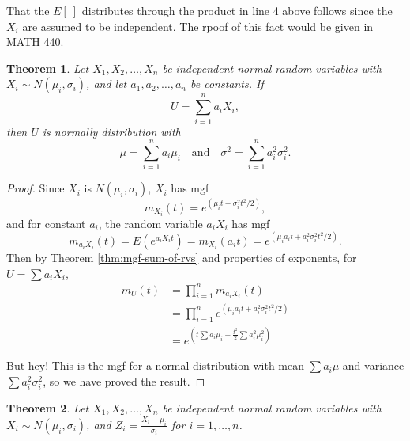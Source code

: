\documentclass[
]{book}
\newtheorem{theorem}{Theorem}[chapter]
\theoremstyle{definition}
\theoremstyle{definition}
\theoremstyle{definition}
\theoremstyle{definition}
\theoremstyle{remark}
\begin{document}
That the \(E[~]\) distributes through the product in line 4 above follows since the \(X_i\) are assumed to be independent. The rpoof of this fact would be given in MATH 440.

\begin{theorem}
\protect\hypertarget{thm:sum-of-normal-rvs}{}\label{thm:sum-of-normal-rvs}Let \(X_1, X_2, \ldots, X_n\) be independent normal random variables with \(X_i \sim N(\mu_i, \sigma_i)\), and let \(a_1, a_2, \ldots, a_n\) be constants. If \[U = \sum_{i=1}^n a_i X_i,\] then \(U\) is normally distribution with \[\mu = \sum_{i=1}^n a_i \mu_i ~~~ \text{ and } ~~~ \sigma^2 = \sum_{i=1}^n a_i^2 \sigma_i^2.\]
\end{theorem}

\begin{proof}
Since \(X_i\) is \(N(\mu_i,\sigma_i)\), \(X_i\) has mgf \[m_{X_i}(t) = e^{\left(\mu_it + \sigma_i^2t^2/2\right)},\] and for constant \(a_i\), the random variable \(a_iX_i\) has mgf \[m_{a_iX_i}(t) =E(e^{a_iX_it}) = m_{X_i}(a_it) = e^{\left(\mu_ia_it + a_i^2\sigma_i^2t^2/2\right)}.\]
Then by Theorem \ref{thm:mgf-sum-of-rvs} and properties of exponents, for \(U = \sum a_i X_i\),
\begin{align*}
m_U(t) &= \prod_{i=1}^n m_{a_iX_i}(t) \\
      &= \prod_{i=1}^n e^{\left(\mu_ia_it + a_i^2\sigma_i^2t^2/2\right)}\\
      &= e^{\left(t\sum a_i\mu_i + \frac{t^2}{2}\sum a_i^2\mu_i^2\right)}
\end{align*}

But hey! This is the mgf for a normal distribution with mean \(\sum a_i \mu\) and variance \(\sum a_i^2 \sigma_i^2\), so we have proved the result.
\end{proof}

\begin{theorem}
\protect\hypertarget{thm:sum-of-squares-of-standard-normal-rvs}{}\label{thm:sum-of-squares-of-standard-normal-rvs}Let \(X_1, X_2, \ldots, X_n\) be independent normal random variables with \(X_i \sim N(\mu_i, \sigma_i)\), and \(\displaystyle Z_i = \frac{X_i - \mu_i}{\sigma_i}\) for \(i = 1, \ldots, n\).
\end{theorem}
\end{document}

